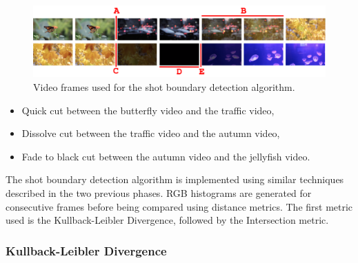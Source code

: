 \begin{figure}[h] 
\centerline{\includegraphics[width=\textwidth]{figures/implementation/shot_boundary_detection_frames.png}}
\caption{\label{fig:shot_boundary_detection_frames}Video frames used for the shot boundary detection algorithm.}
\end{figure}

\begin{itemize}
    \item Quick cut between the butterfly video and the traffic video,
    \item Dissolve cut between the traffic video and the autumn video,
    \item Fade to black cut between the autumn video and the jellyfish video.
\end{itemize}

The shot boundary detection algorithm is implemented using similar techniques described in the two previous phases. RGB histograms are generated for consecutive frames before being compared using distance metrics. The first metric used is the Kullback-Leibler Divergence, followed by the Intersection metric.

\subsubsection{Kullback-Leibler Divergence}

